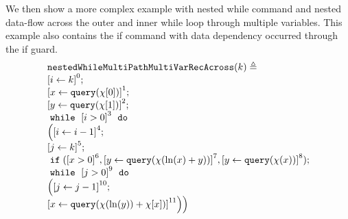                                 \begin{example}
                                    \label{ex:nestedWhileMultiPathMultiVarRecAcross}
                                    We then show a more complex example with nested while command and nested data-flow across the outer and inner while loop through multiple variables.
                                    This example also contains the if command with data dependency occurred through the if guard.
                                    \[
                                    \begin{array}{l}
                                    \kw{nestedWhileMultiPathMultiVarRecAcross}(k) \triangleq \\
                                        \clabel{\assign{i}{k} }^{0} ; \\
                                        \clabel{ \assign{x}{\query(\chi[0])}}^{1} ; \\
                                        \clabel{ \assign{y}{\query(\chi[1])}}^{2} ; \\
                                            \ewhile ~ \clabel{i > 0}^{3} ~ \edo ~ \\
                                            \Big(
                                             \clabel{\assign{i}{i-1}}^{4} ;\\
                                             \clabel{\assign{j}{k}}^{5} ;\\
                                             \eif(\clabel{x > 0}^6, \clabel{\assign{y}{\query(\chi(\ln(x) + y))} }^{7},
                                             \clabel{\assign{y}{\query(\chi(x))} }^{8} )
                                              ; \\
                                             \ewhile ~ \clabel{j > 0}^{9} ~ \edo ~ \\
                                             \Big(
                                              \clabel{\assign{j}{j-1}}^{10};\\
                                              \clabel{\assign{x}{\query(\chi(\ln(y))+\chi[x])} }^{11}
                                              \Big) \Big)
                                        \end{array}
                                    \]
                                    \end{example}
